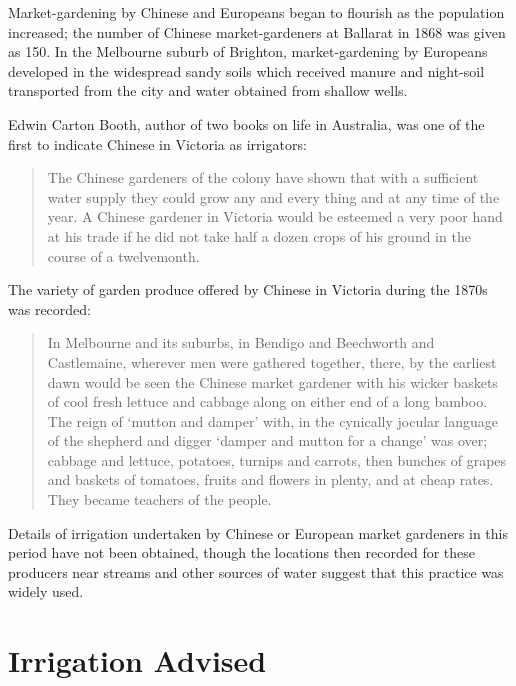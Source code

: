 Market-gardening  by Chinese and Europeans began
to flourish as the population increased; the number of Chinese
market-gardeners at Ballarat  in 1868 was given
as 150.  In the Melbourne suburb of Brighton, 
market-gardening by Europeans developed in the widespread sandy soils
which received manure and night-soil transported from the city and
water obtained from shallow wells.

Edwin Carton Booth,  author of two books on life
in Australia, was one of the first to indicate Chinese in Victoria as
irrigators:
\begin{quote}
	The Chinese gardeners of the colony have shown that with a
	sufficient water supply they could grow any and every thing
	and at any time of the year. A Chinese gardener in Victoria
	would be esteemed a very poor hand at his trade if he did not
	take half a dozen crops of his ground in the course of a
	twelvemonth.
\end{quote}

The variety of garden produce offered by Chinese in Victoria during
the 1870s was record\-ed:
\begin{quote}
	In Melbourne and its suburbs, in Bendigo and Beechworth and
	Castlemaine, wherever men were gathered together, there, by
	the earliest dawn would be seen the Chinese market gardener
	with his wicker baskets of cool fresh lettuce and cabbage
	along on either end of a long bamboo.  The reign of `mutton
	and damper' with, in the cynically jocular language of the
	shepherd and digger `damper and mutton for a change' was over;
	cabbage and lettuce, potatoes, turnips and carrots, then
	bunches of grapes and baskets of tomatoes, fruits and flowers
	in plenty, and at cheap rates. They became teachers of the
	people.
\end{quote}

Details of irrigation undertaken by Chinese or European market
gardeners in this period have not been obtained, though the locations
then recorded for these producers near streams and other sources of
water suggest that this practice was widely used.

\section*{Irrigation Advised}

